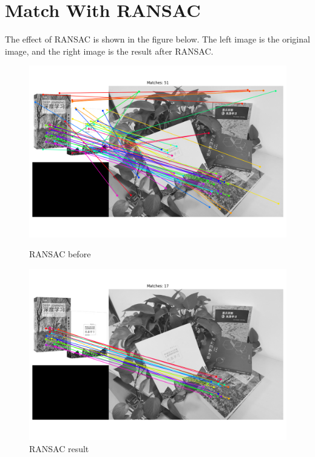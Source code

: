 \documentclass[]{article}
\begin{document}
\section{Match With RANSAC}
The effect of RANSAC is shown in the figure below. The left image is the original image, and the right image is the result after RANSAC.
\begin{figure}[h]
	\centering
	\begin{minipage}{0.48\textwidth}
		\centering
		\includegraphics[width=\textwidth]{before_ransac.png}
		\caption{RANSAC before}
		\label{fig:ransac_result}
	\end{minipage}
	\hfill
	\begin{minipage}{0.48\textwidth}
		\centering
		\includegraphics[width=\textwidth]{after_ransac.png}
		\caption{RANSAC result }
		\label{fig:ransac_result1}
	\end{minipage}
\end{figure}
\end{document}
